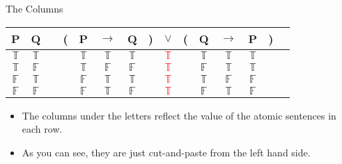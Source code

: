 \documentclass[
  ignorenonframetext,
]{beamer}
\providecommand{\tightlist}{%
  \setlength{\itemsep}{0pt}\setlength{\parskip}{0pt}}
\renewcommand{\,}{\text{, }}
\def\True{\mathbb{T}}
\def\False{\mathbb{F}}
\begin{document}
\begin{frame}{The Columns}
\protect\hypertarget{the-columns}{}
\begin{center}
\begin{tabular}{@{ }c@{ }@{ }c | c@{ }@{}c@{}@{ }c@{ }@{ }c@{ }@{ }c@{ }@{}c@{}@{ }c@{ }@{}c@{}@{ }c@{ }@{ }c@{ }@{ }c@{ }@{}c@{}@{ }c}
P & Q &  & ( & P & $\rightarrow$ & Q & ) & $\lor$ & ( & Q & $\rightarrow$ & P & ) & \\
\hline 
$\True$ & $\True$ &  &  & $\True$ & $\True$ & $\True$ &  & \textcolor{red}{$\True$} &  & $\True$ & $\True$ & $\True$ &  & \\
$\True$ & $\False$ &  &  & $\True$ & $\False$ & $\False$ &  & \textcolor{red}{$\True$} &  & $\False$ & $\True$ & $\True$ &  & \\
$\False$ & $\True$ &  &  & $\False$ & $\True$ & $\True$ &  & \textcolor{red}{$\True$} &  & $\True$ & $\False$ & $\False$ &  & \\
$\False$ & $\False$ &  &  & $\False$ & $\True$ & $\False$ &  & \textcolor{red}{$\True$} &  & $\False$ & $\True$ & $\False$ &  & \\
\end{tabular}

\end{center}

\begin{itemize}
\tightlist
\item
  The columns under the letters reflect the value of the atomic
  sentences in each row.
\item
  As you can see, they are just cut-and-paste from the left hand side.
\end{itemize}
\end{frame}
\end{document}
